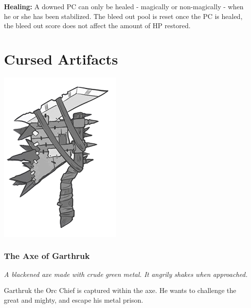 \documentclass[letterpaper,sansserif,tightsqueeze]{rpg-module}
\begin{document}
\textbf{Healing:} A downed PC can only be healed - magically or non-magically - when he or she has been stabilized. The bleed out pool is reset once the PC is healed, the bleed out score does not affect the amount of HP restored.

\newpage

\vspace{0.5cm}
\part*{Cursed Artifacts}
\vspace{0.5cm}

\begin{center}
	\includegraphics[width = 0.5\linewidth]{Garthruks_axe.png}
\end{center}
\section{The Axe of Garthruk}
\textit{A blackened axe made with crude green metal. It angrily shakes when approached.}

Garthruk the Orc Chief is captured within the axe. He wants to challenge the great and mighty, and escape his metal prison.
\end{document}
